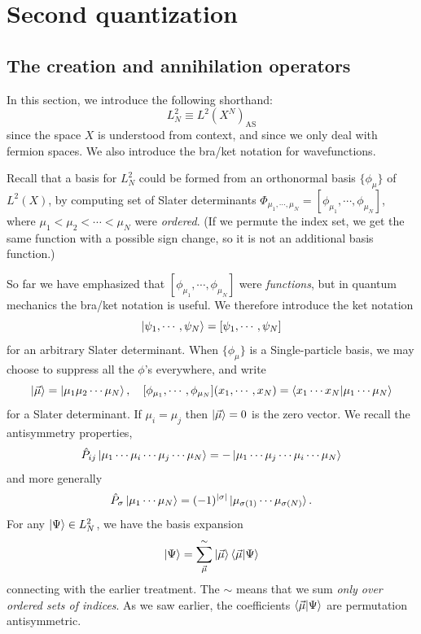 \documentclass{report}
\theoremstyle{plain}
\theoremstyle{definition}
\begin{document}
\section{Second quantization}

\subsection{The creation and annihilation operators}

In this section, we introduce the following shorthand:
\begin{equation}
  L^2_N \equiv L^2(X^N)_\text{AS}
\end{equation}
since the space $X$ is understood from context, and since we only deal
with fermion spaces. We also introduce the bra/ket notation for
wavefunctions. 

Recall that a basis for $L^2_N$ could be formed from an orthonormal
basis $\{\phi_\mu\}$ of $L^2(X)$, by computing  set of Slater
determinants $\Phi_{\mu_1,\cdots,\mu_N} = [\phi_{\mu_1},\cdots,\phi_{\mu_N}]$, where
$\mu_1<\mu_2<\cdots<\mu_N$ were \emph{ordered}. (If we permute the
index set, we get the same function with a possible sign change, so it
is not an additional basis function.) 

So far we have emphasized that $[\phi_{\mu_1},\cdots,\phi_{\mu_N}]$
were \emph{functions}, but in quantum mechanics the bra/ket notation
is useful. We therefore introduce the ket notation
\begin{equation}
  \ket{\psi_1,\cdots,\psi_N} = [\psi_1,\cdots,\psi_N]
\end{equation}
for an arbitrary Slater determinant. When $\{\phi_\mu\}$ is a
Single-particle basis, we may choose to suppress all the $\phi$'s
everywhere, and write
\begin{equation}
  \ket{\vec{\mu}} = \ket{\mu_1\mu_2\cdots\mu_N}, \quad
  [\phi_{\mu_1},\cdots,\phi_{\mu_N}](x_1,\cdots,x_N) = \braket{x_1\cdots x_N|\mu_1\cdots\mu_N}
\end{equation}
for a Slater determinant. If
$\mu_i=\mu_j$ then $\ket{\vec{\mu}} = 0$ is the zero vector. We recall
the antisymmetry properties,
\begin{equation}
  \hat{P}_{ij}\ket{\mu_1\cdots\mu_i\cdots\mu_j\cdots\mu_N} =
  -\ket{\mu_1\cdots\mu_j\cdots\mu_i\cdots\mu_N} 
\end{equation}
and more generally
\begin{equation}
  \hat{P}_\sigma \ket{\mu_1\cdots\mu_N} = (-1)^{|\sigma|} \ket{\mu_{\sigma(1)}\cdots\mu_{\sigma(N)}}.
\end{equation}
For any $\ket{\Psi}\in L^2_N$, we have the basis expansion
\begin{equation}
  \ket{\Psi} = \sum_{\vec{\mu}}^\sim \ket{\vec{\mu}}\braket{\vec{\mu}|\Psi}
\end{equation}
connecting with the earlier treatment. The $\sim$ means that we sum
\emph{only over ordered sets of indices}. As we saw earlier, the
coefficients $\braket{\vec{\mu}|\Psi}$ are permutation antisymmetric.
\end{document}
